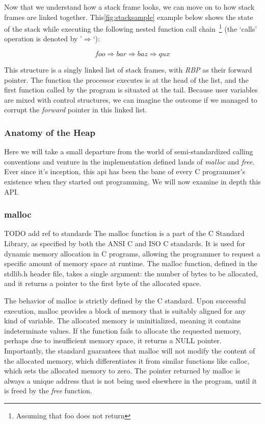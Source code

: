 \documentclass{article}
\begin{document}
Now that we understand how a stack frame looks, we can move on to how stack frames are linked together. This\ref{fig:stacksample} example below shows the state of the stack while executing the following nested function call chain~\footnote{Assuming that foo does not return} (the `calls' operation is denoted by '$\Rightarrow$`):

\begin{equation}
  foo \Rightarrow bar \Rightarrow baz \Rightarrow qux
\end{equation}

This structure is a singly linked list of stack frames, with \emph{RBP} as their forward pointer. The function the processor executes is at the head of the list, and the first function called by the program is situated at the tail. Because user variables are mixed with control structures, we can imagine the outcome if we managed to corrupt the \emph{forward} pointer in this linked list.


\subsubsection{Anatomy of the Heap}
Here we will take a small departure
from the world of semi-standardized calling conventions and venture in the
implementation defined lands of \emph{malloc} and \emph{free}. Ever since it's
inception, this api has been the bane of every C programmer's existence when
they started out programming. We will now examine in depth this API.\@

\subsubsection{malloc}
TODO add ref to standards
The malloc function is a part of the C Standard Library, as specified by both
the ANSI C and ISO C standards. It is used for dynamic memory allocation in C
programs, allowing the programmer to request a specific amount of memory space
at runtime. The malloc function, defined in the stdlib.h header file, takes a
single argument: the number of bytes to be allocated, and it returns a pointer
to the first byte of the allocated space.

The behavior of malloc is strictly defined by the C standard. Upon successful
execution, malloc provides a block of memory that is suitably aligned for any
kind of variable. The allocated memory is uninitialized, meaning it contains
indeterminate values. If the function fails to allocate the requested memory,
perhaps due to insufficient memory space, it returns a NULL pointer.
Importantly, the standard guarantees that malloc will not modify the content of
the allocated memory, which differentiates it from similar functions like
calloc, which sets the allocated memory to zero. The pointer returned by malloc
is always a unique address that is not being used elsewhere in the program,
until it is freed by the \emph{free} function.
\end{document}

